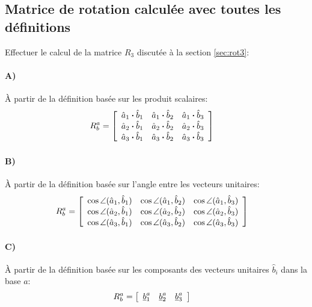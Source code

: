 
\subsection{Matrice de rotation calculée avec toutes les définitions}

Effectuer le calcul de la matrice $R_3$ discutée à la section \ref{sec:rot3}:

\paragraph{A)} À partir de la définition basée sur les produit scalaires:
\begin{align}
R_b^a &= 
\left[ \begin{array}{c c c} 
\hat{a}_1 \bullet \hat{b}_1  &  \hat{a}_1 \bullet \hat{b}_2  &  \hat{a}_1 \bullet \hat{b}_3 \\
\hat{a}_2 \bullet \hat{b}_1  &  \hat{a}_2 \bullet \hat{b}_2  &  \hat{a}_2 \bullet \hat{b}_3 \\
\hat{a}_3 \bullet \hat{b}_1  &  \hat{a}_3 \bullet \hat{b}_2  &  \hat{a}_3 \bullet \hat{b}_3 
\end{array} \right] 
\end{align} 
\paragraph{B)} À partir de la définition basée sur l'angle entre les vecteurs unitaires:
\begin{align}
R_b^a &= 
\left[ \begin{array}{c c c} 
\cos \angle (\hat{a}_1 , \hat{b}_1)  &  \cos \angle (\hat{a}_1 , \hat{b}_2)  &  \cos \angle (\hat{a}_1 , \hat{b}_3) \\
\cos \angle (\hat{a}_2 , \hat{b}_1)  &  \cos \angle (\hat{a}_2 , \hat{b}_2)  &  \cos \angle (\hat{a}_2 , \hat{b}_3) \\
\cos \angle (\hat{a}_3 , \hat{b}_1)  &  \cos \angle (\hat{a}_3 , \hat{b}_2)  &  \cos \angle (\hat{a}_3 , \hat{b}_3) 
\end{array} \right] 
\end{align} 
\paragraph{C)} À partir de la définition basée sur les composants des vecteurs unitaires $\hat{b}_i$ dans la base $a$:
\begin{align}
R_b^a &= 
\left[ \begin{array}{c c c} 
\col{b}_1^a &  \col{b}_2^a & \col{b}_3^a
\end{array} \right] 
\end{align} 
